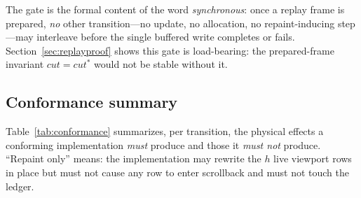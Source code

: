 \documentclass[11pt]{article}
\newcommand{\rcut}{\mathit{cut}}
\theoremstyle{definition}
\theoremstyle{remark}
\begin{document}
The gate is the formal content of the word \emph{synchronous}: once a replay
frame is prepared, \emph{no} other transition---no update, no allocation, no
repaint-inducing step---may interleave before the single buffered write
completes or fails. Section~\ref{sec:replayproof} shows this gate is
load-bearing: the prepared-frame invariant $\rcut=\rcut^{*}$ would not be
stable without it.

\subsection{Conformance summary}\label{sec:conformance}

Table~\ref{tab:conformance} summarizes, per transition, the physical effects
a conforming implementation \emph{must} produce and those it \emph{must not}
produce. ``Repaint only'' means: the implementation may rewrite the $h$ live
viewport rows in place but must not cause any row to enter scrollback and
must not touch the ledger.
\end{document}
